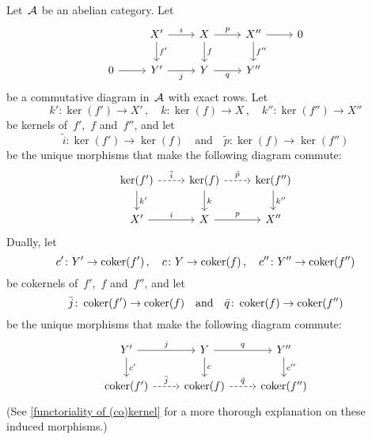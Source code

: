\begin{lemma}
  Let~$\mathcal{A}$ be an abelian category.
  Let
  \begin{equation}
    \label{presnake}
    \begin{tikzcd}
        {}
      & X'
        \arrow{r}[above]{i}
        \arrow{d}[right]{f'}
      & X
        \arrow{r}[above]{p}
        \arrow{d}[right]{f}
      & X''
        \arrow{d}[right]{f''}
        \arrow{r}
      & 0
      \\
        0
        \arrow{r}
      & Y'
        \arrow{r}[below]{j}
      & Y
        \arrow{r}[below]{q}
      & Y''
      & {}
    \end{tikzcd}
  \end{equation}
  be a commutative diagram in~$\mathcal{A}$ with exact rows.
  Let
  \[
    k' \colon \ker(f') \to X' \,,
    \quad
    k \colon \ker(f) \to X \,,
    \quad
    k'' \colon \ker(f'') \to X''
  \]
  be kernels of~$f'$,~$f$ and~$f''$, and let
  \[
    \tilde{i} \colon \ker(f') \to \ker(f)
    \quad\text{and}\quad
    \tilde{p} \colon \ker(f) \to \ker(f'')
  \]
  be the unique morphisms that make the following diagram commute:
  \[
    \begin{tikzcd}
        \ker(f')
        \arrow[dashed]{r}[above]{\tilde{i}}
        \arrow{d}[right]{k'}
      & \ker(f)
        \arrow[dashed]{r}[above]{\tilde{p}}
        \arrow{d}[right]{k}
      & \ker(f'')
        \arrow{d}[right]{k''}
      \\
        X'
        \arrow{r}[above]{i}
      & X
        \arrow{r}[above]{p}
      & X''
    \end{tikzcd}
  \]
  Dually, let
  \[
    c' \colon Y' \to \operatorname{coker}(f') \,,
    \quad
    c \colon Y \to \operatorname{coker}(f) \,,
    \quad
    c'' \colon Y'' \to \operatorname{coker}(f'')
  \]
  be cokernels of~$f'$,~$f$ and~$f''$, and let
  \[
    \bar{j} \colon \operatorname{coker}(f') \to \operatorname{coker}(f)
    \quad\text{and}\quad
    \bar{q} \colon \operatorname{coker}(f) \to \operatorname{coker}(f'')
  \]
  be the unique morphisms that make the following diagram commute:
  \[
    \begin{tikzcd}
        Y'
        \arrow{r}[above]{j}
        \arrow{d}[right]{c'}
      & Y
        \arrow{r}[above]{q}
        \arrow{d}[right]{c}
      & Y''
        \arrow{d}[right]{c''}
      \\
        \coker(f')
        \arrow[dashed]{r}[above]{\bar{j}}
      & \coker(f)
        \arrow[dashed]{r}[above]{\bar{q}}
      & \coker(f'')
    \end{tikzcd}
  \]
  (See \cref{functoriality of (co)kernel} for a more thorough explanation on these induced morphisms.)


\end{lemma}

